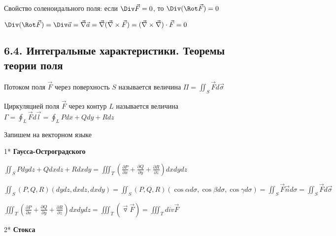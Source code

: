 \documentclass[12pt]{article}
\begin{document}
    \begin{MyTheorem}
         Свойство соленоидального поля: если $\Div \vec{F} = 0$, то $\Div (\Rot \vec{F}) = 0$
    \end{MyTheorem}

    \begin{MyProof}
        $\Div (\Rot \vec{F}) = \Div \vec{a} = \vec\nabla \vec{a} = \vec\nabla (\vec\nabla \times \vec{F}) = (\vec\nabla \times \vec\nabla) \cdot \vec{F} = 0$
    \end{MyProof}

    \hypertarget{integralcharacteristics}{}

    \subsection{6.4. Интегральные характеристики. Теоремы теории поля}

    \Mems Потоком поля $\vec{F}$ через поверхность $S$ называется величина $\Pi = \iint_S \vec{F}d\vec{\sigma}$

    \Defs Циркуляцией поля $\vec{F}$ через контур $L$ называется величина $\Gamma = \oint_L \vec F d\vec l = \oint_L Pdx + Qdy + Rdz$

    \Nota Запишем \Ths на векторном языке

    \hypertarget{theoremGaussOstrogradskyyinvectorform}{}

    1* \textbf{Гаусса-Остроградского}

    $\iint_S Pdydz + Qdxdz + Rdxdy = \iiint_T \left(\frac{\partial P}{\partial x} + \frac{\partial Q}{\partial y} + \frac{\partial R}{\partial z}\right) dxdydz$

    $\iint_S (P, Q, R) (dydz, dxdz, dxdy) = \iint_S (P, Q, R) (\cos\alpha d\sigma, \cos\beta d\sigma, \cos\gamma d\sigma) =
    \iint_S \overrightarrow{F} \overrightarrow{n} d\sigma = \iint_S \overrightarrow{F} d\overrightarrow{\sigma}$

    $\iiint_T \left(\frac{\partial P}{\partial x} + \frac{\partial Q}{\partial y} + \frac{\partial R}{\partial z}\right) dxdydz = \iiint_T (\overrightarrow{\triangledown} \overrightarrow{F}) = \iiint_T div \overrightarrow{F}$


    \mediumvspace

    \hypertarget{theoremStokesinvectorform}{}

    2* \textbf{Стокса}
\end{document}
